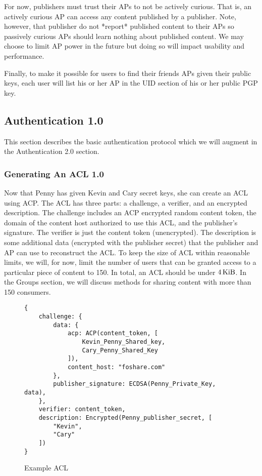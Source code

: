 \documentclass[pdftex,12pt,a4papaer]{article}
\begin{document}
For now, publishers must trust their APs to not be actively curious. That is, an
actively curious AP can access any content published by a publisher. Note,
however, that publisher do not *report* published content to their APs so
passively curious APs should learn nothing about published content. We may
choose to limit AP power in the future but doing so will impact usability and
performance.

Finally, to make it possible for users to find their friends APs  given their
public keys, each user will list his or her AP in the UID section of his or her
public PGP key.


\subsection{Authentication 1.0}

This section describes the basic authentication protocol which we will augment
in the Authentication 2.0 section.

\subsubsection{Generating An ACL 1.0}

Now that Penny has given Kevin and Cary secret keys, she can create an ACL using
ACP\@. The ACL has three parts: a challenge, a verifier, and an encrypted
description. The challenge includes an ACP encrypted random content token, the
domain of the content host authorized to use this ACL, and the publisher's
signature. The verifier is just the content token (unencrypted). The description
is some additional data (encrypted with the publisher secret) that the publisher
and AP can use to reconstruct the ACL\@. To keep the size of ACL within
reasonable limits, we will, for now, limit the number of users that can be
granted access to a particular piece of content to 150. In total, an ACL should
be under $\unit[4]{KiB}$. In the Groups section, we will discuss methods for
sharing content with more than 150 consumers.


\begin{figure}[H]
\begin{verbatim}
{
    challenge: {
        data: {
            acp: ACP(content_token, [
                Kevin_Penny_Shared_key,
                Cary_Penny_Shared_Key
            ]),
            content_host: "foshare.com"
        },
        publisher_signature: ECDSA(Penny_Private_Key, data),
    },
    verifier: content_token,
    description: Encrypted(Penny_publisher_secret, [
        "Kevin",
        "Cary"
    ])
}
\end{verbatim}
\caption{Example ACL}
\end{figure}
\end{document}
